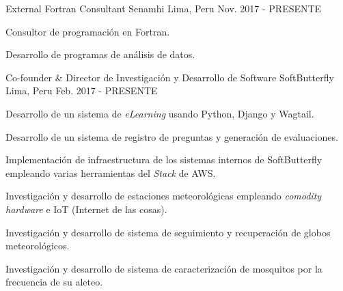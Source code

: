 

\begin{cventries}

  \cventry
    {External Fortran Consultant} %
    {Senamhi} %
    {Lima, Peru} %
    {Nov. 2017 - PRESENTE} %
    {
      \begin{cvitems} %
        \item {Consultor de programación en Fortran.}
        \item {Desarrollo de programas de análisis de datos.}
      \end{cvitems}
    }

  \cventry
    {Co-founder \& Director de Investigación y Desarrollo de Software} %
    {SoftButterfly} %
    {Lima, Peru} %
    {Feb. 2017 - PRESENTE} %
    {
      \begin{cvitems} %
        \item {Desarrollo de un sistema de \textit{eLearning} usando Python, Django y Wagtail.}
        \item {Desarrollo de un sistema de registro de preguntas y generación
        de evaluaciones.}
        \item {Implementación de infraestructura de los sistemas internos de
        SoftButterfly empleando varias herramientas del \textit{Stack} de AWS.}
        \item {Investigación y desarrollo de estaciones meteorológicas empleando
        \textit{comodity hardware} e IoT (Internet de las cosas).}
        \item {Investigación y desarrollo de sistema de seguimiento y
        recuperación de globos meteorológicos.}
        \item {Investigación y desarrollo de sistema de caracterización de
        mosquitos por la frecuencia de su aleteo.}
      \end{cvitems}
    }


\end{cventries}
